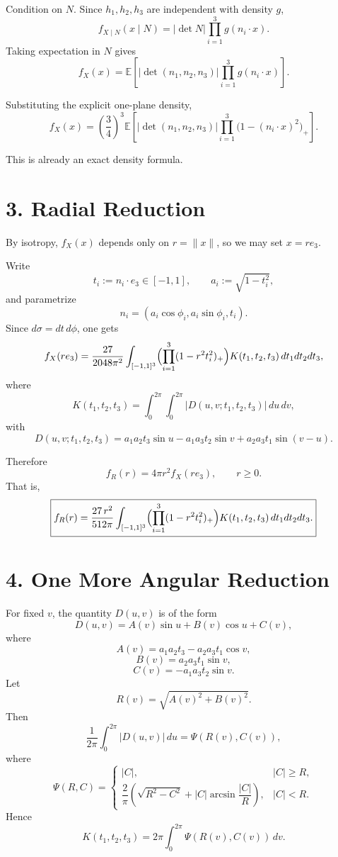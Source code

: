 \documentclass[11pt]{article}
\begin{document}
Condition on $N$. Since $h_1,h_2,h_3$ are independent with density $g$,
\[
f_{X\mid N}(x\mid N)
=
|\det N|\prod_{i=1}^3 g(n_i\cdot x).
\]
Taking expectation in $N$ gives
\[
\boxed{
f_X(x)
=
\mathbb{E}\!\left[
\left|\det(n_1,n_2,n_3)\right|
\prod_{i=1}^3 g(n_i\cdot x)
\right].
}
\]

Substituting the explicit one-plane density,
\[
\boxed{
f_X(x)
=
\left(\frac{3}{4}\right)^3
\mathbb{E}\!\left[
\left|\det(n_1,n_2,n_3)\right|
\prod_{i=1}^3 \bigl(1-(n_i\cdot x)^2\bigr)_+
\right].
}
\]

This is already an exact density formula.

\section*{3. Radial Reduction}

By isotropy, $f_X(x)$ depends only on $r=\|x\|$, so we may set $x = re_3$.

Write
\[
t_i := n_i \cdot e_3 \in [-1,1],
\qquad
a_i := \sqrt{1-t_i^2},
\]
and parametrize
\[
n_i = (a_i\cos\phi_i, a_i\sin\phi_i, t_i).
\]
Since $d\sigma = dt\,d\phi$, one gets
\[
f_X(re_3)
=
\frac{27}{2048\pi^2}
\int_{[-1,1]^3}
\Bigl(\prod_{i=1}^3 (1-r^2 t_i^2)_+\Bigr)
K(t_1,t_2,t_3)\,dt_1dt_2dt_3,
\]
where
\[
K(t_1,t_2,t_3)
=
\int_0^{2\pi}\int_0^{2\pi}
|D(u,v;t_1,t_2,t_3)|\,du\,dv,
\]
with
\[
D(u,v;t_1,t_2,t_3)
=
a_1a_2t_3\sin u
-a_1a_3t_2\sin v
+a_2a_3t_1\sin(v-u).
\]

Therefore
\[
\boxed{
f_R(r) = 4\pi r^2 f_X(re_3), \qquad r\ge 0.
}
\]
That is,
\[
\boxed{
f_R(r)
=
\frac{27\,r^2}{512\pi}
\int_{[-1,1]^3}
\Bigl(\prod_{i=1}^3 (1-r^2 t_i^2)_+\Bigr)
K(t_1,t_2,t_3)\,dt_1dt_2dt_3.
}
\]

\section*{4. One More Angular Reduction}

For fixed $v$, the quantity $D(u,v)$ is of the form
\[
D(u,v) = A(v)\sin u + B(v)\cos u + C(v),
\]
where
\[
A(v)=a_1a_2t_3-a_2a_3t_1\cos v,
\]
\[
B(v)=a_2a_3t_1\sin v,
\]
\[
C(v)=-a_1a_3t_2\sin v.
\]
Let
\[
R(v) = \sqrt{A(v)^2+B(v)^2}.
\]
Then
\[
\frac{1}{2\pi}\int_0^{2\pi}|D(u,v)|\,du = \Psi(R(v),C(v)),
\]
where
\[
\Psi(R,C)
=
\begin{cases}
|C|, & |C|\ge R,\\[6pt]
\dfrac{2}{\pi}\left(\sqrt{R^2-C^2}+|C|\arcsin\!\dfrac{|C|}{R}\right), & |C|<R.
\end{cases}
\]
Hence
\[
K(t_1,t_2,t_3)
=
2\pi\int_0^{2\pi}\Psi(R(v),C(v))\,dv.
\]
\end{document}
